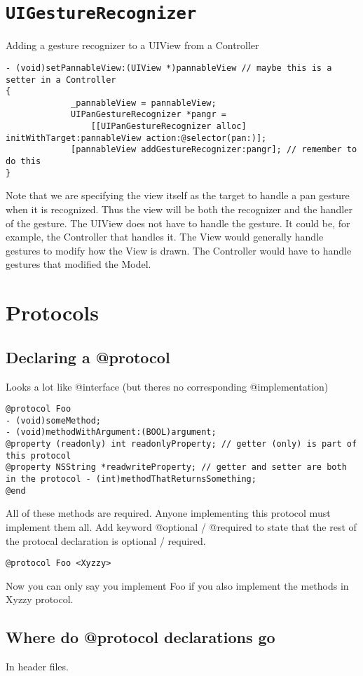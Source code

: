 \documentclass[12pt]{article}
\newcommand{\co}{\texttt}
\begin{document}
\section{\co{UIGestureRecognizer}}
Adding a gesture recognizer to a UIView from a Controller 
\begin{lstlisting}
- (void)setPannableView:(UIView *)pannableView // maybe this is a setter in a Controller
{
             _pannableView = pannableView;
             UIPanGestureRecognizer *pangr =
                 [[UIPanGestureRecognizer alloc] initWithTarget:pannableView action:@selector(pan:)];
             [pannableView addGestureRecognizer:pangr]; // remember to do this
}
\end{lstlisting}
Note that we are specifying the view itself as the target to handle a pan gesture when it is recognized. Thus the view will be both the recognizer and the handler of the gesture.
The UIView does not have to handle the gesture. It could be, for example, the Controller that handles it. The View would generally handle gestures to modify how the View is drawn.
The Controller would have to handle gestures that modified the Model.

\section{Protocols}
\subsection{Declaring a @protocol}
Looks a lot like @interface (but theres no corresponding @implementation) 
\begin{lstlisting}
@protocol Foo
- (void)someMethod;
- (void)methodWithArgument:(BOOL)argument;
@property (readonly) int readonlyProperty; // getter (only) is part of this protocol
@property NSString *readwriteProperty; // getter and setter are both in the protocol - (int)methodThatReturnsSomething;
@end
\end{lstlisting}
All of these methods are required. Anyone implementing this protocol must implement them all.
Add keyword @optional / @required to state that the rest of the protocal declaration is optional / required.
\begin{lstlisting}
@protocol Foo <Xyzzy>
\end{lstlisting}
Now you can only say you implement Foo if you also implement the methods in Xyzzy protocol.

\subsection{Where do @protocol declarations go}
In header files.
\end{document}
